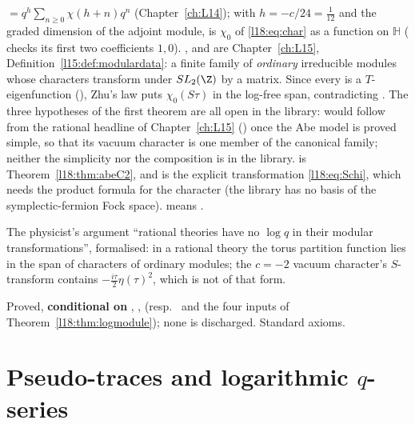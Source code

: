 \begin{dictionary}
 $=q^h\sum_{n\ge0}\chi(h+n)q^n$ (Chapter~\ref{ch:L14}); with $h=-c/24=\frac1{12}$ and the graded dimension
of the adjoint module,  is $\chi_0$ of \eqref{l18:eq:char} as a function on $\mathbb H$
( checks its first two coefficients $1,0$). ,  and
 are Chapter~\ref{ch:L15}, Definition~\ref{l15:def:modulardata}: a finite family of \emph{ordinary}
irreducible modules whose characters transform under $SL_2(\Z)$ by a matrix. Since every  is a
$T$-eigenfunction (), Zhu's law puts $\chi_0(S\tau)$ in the log-free span, contradicting
. The three hypotheses of the first theorem are all open in the library:  would follow from the
rational headline of Chapter~\ref{ch:L15} () once the Abe
model is proved simple, so that its vacuum character is one member of the canonical family; neither the simplicity nor
the composition is in the library.  is
Theorem~\ref{l18:thm:abeC2}, and  is the explicit transformation \eqref{l18:eq:Schi}, which needs the
product formula for the character (the library has no basis of the symplectic-fermion Fock space).
 means .
\end{dictionary}
\begin{physics}
The physicist's argument ``rational theories have no $\log q$ in their modular transformations'', formalised:
in a rational theory the torus partition function lies in the span of characters of ordinary modules; the $c=-2$
vacuum character's $S$-transform contains $-\frac{i\tau}2\eta(\tau)^2$, which is not of that form.
\end{physics}
\begin{status}
Proved, \textbf{conditional on} , ,  (resp.\  and the four inputs of
Theorem~\ref{l18:thm:logmodule}); none is discharged. Standard axioms.
\end{status}

\section{Pseudo-traces and logarithmic \texorpdfstring{$q$}{q}-series}\label{l18:sec:pseudo}

